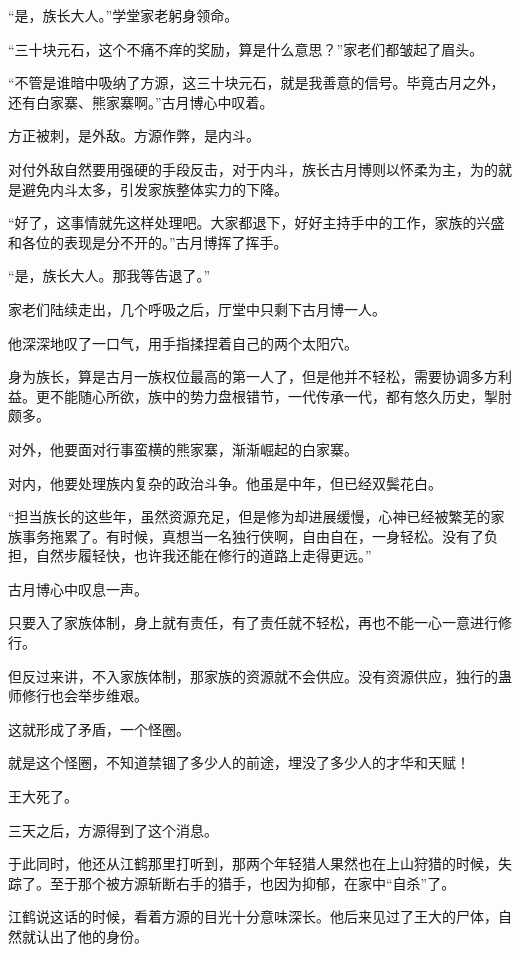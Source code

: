\begin{this_body}
“是，族长大人。”学堂家老躬身领命。

“三十块元石，这个不痛不痒的奖励，算是什么意思？”家老们都皱起了眉头。

“不管是谁暗中吸纳了方源，这三十块元石，就是我善意的信号。毕竟古月之外，还有白家寨、熊家寨啊。”古月博心中叹着。

方正被刺，是外敌。方源作弊，是内斗。

对付外敌自然要用强硬的手段反击，对于内斗，族长古月博则以怀柔为主，为的就是避免内斗太多，引发家族整体实力的下降。

“好了，这事情就先这样处理吧。大家都退下，好好主持手中的工作，家族的兴盛和各位的表现是分不开的。”古月博挥了挥手。

“是，族长大人。那我等告退了。”

家老们陆续走出，几个呼吸之后，厅堂中只剩下古月博一人。

他深深地叹了一口气，用手指揉捏着自己的两个太阳穴。

身为族长，算是古月一族权位最高的第一人了，但是他并不轻松，需要协调多方利益。更不能随心所欲，族中的势力盘根错节，一代传承一代，都有悠久历史，掣肘颇多。

对外，他要面对行事蛮横的熊家寨，渐渐崛起的白家寨。

对内，他要处理族内复杂的政治斗争。他虽是中年，但已经双鬓花白。

“担当族长的这些年，虽然资源充足，但是修为却进展缓慢，心神已经被繁芜的家族事务拖累了。有时候，真想当一名独行侠啊，自由自在，一身轻松。没有了负担，自然步履轻快，也许我还能在修行的道路上走得更远。”

古月博心中叹息一声。

只要入了家族体制，身上就有责任，有了责任就不轻松，再也不能一心一意进行修行。

但反过来讲，不入家族体制，那家族的资源就不会供应。没有资源供应，独行的蛊师修行也会举步维艰。

这就形成了矛盾，一个怪圈。

就是这个怪圈，不知道禁锢了多少人的前途，埋没了多少人的才华和天赋！

王大死了。

三天之后，方源得到了这个消息。

于此同时，他还从江鹤那里打听到，那两个年轻猎人果然也在上山狩猎的时候，失踪了。至于那个被方源斩断右手的猎手，也因为抑郁，在家中“自杀”了。

江鹤说这话的时候，看着方源的目光十分意味深长。他后来见过了王大的尸体，自然就认出了他的身份。


\end{this_body}
